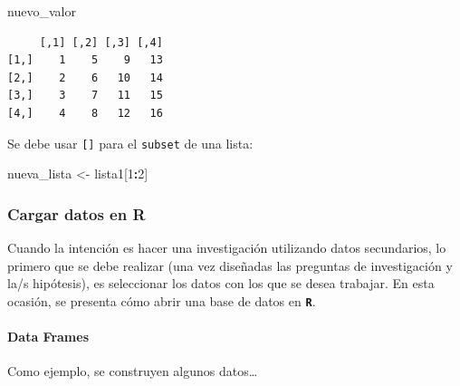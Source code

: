 \documentclass[
]{article}
\newenvironment{Shaded}{\begin{snugshade}}{\end{snugshade}}
\newcommand{\DecValTok}[1]{\textcolor[rgb]{0.00,0.00,0.81}{#1}}
\newcommand{\NormalTok}[1]{#1}
\newcommand{\OtherTok}[1]{\textcolor[rgb]{0.56,0.35,0.01}{#1}}
\newcommand{\SpecialCharTok}[1]{\textcolor[rgb]{0.81,0.36,0.00}{\textbf{#1}}}
\begin{document}
\begin{Shaded}
\begin{Highlighting}[]
\NormalTok{nuevo\_valor}
\end{Highlighting}
\end{Shaded}

\begin{verbatim}
     [,1] [,2] [,3] [,4]
[1,]    1    5    9   13
[2,]    2    6   10   14
[3,]    3    7   11   15
[4,]    4    8   12   16
\end{verbatim}

Se debe usar \texttt{{[}{]}} para el \texttt{subset} de una lista:

\begin{Shaded}
\begin{Highlighting}[]
\NormalTok{nueva\_lista }\OtherTok{\textless{}{-}}\NormalTok{ lista1[}\DecValTok{1}\SpecialCharTok{:}\DecValTok{2}\NormalTok{]}
\end{Highlighting}
\end{Shaded}

\hypertarget{cargar-datos-en-r}{%
\subsubsection{Cargar datos en R}\label{cargar-datos-en-r}}

Cuando la intención es hacer una investigación utilizando datos secundarios, lo primero que se debe realizar (una vez diseñadas las preguntas de investigación y la/s hipótesis), es seleccionar los datos con los que se desea trabajar. En esta ocasión, se presenta cómo abrir una base de datos en \textbf{\texttt{R}}.

\hypertarget{data-frames}{%
\paragraph{Data Frames}\label{data-frames}}

Como ejemplo, se construyen algunos datos\ldots{}
\end{document}

